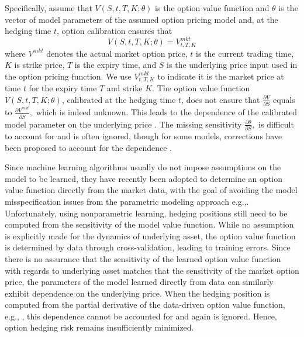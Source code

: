 \documentclass[letterpaper,12pt,titlepage,oneside,final]{book}
\numberwithin{equation}{section}
\theoremstyle{definition}
\newcommand{\Vmkt}{V^{mkt}}
\begin{document}
Specifically, assume that $V(S,t,T,K;\theta)$ is  the option value function and $\theta$ is the vector of model parameters of the assumed option pricing model and, at the hedging time $t$,
option calibration ensures that
\begin{equation} \label{eq:imp}
V(S,t,T,K; \theta)=V^{mkt}_{t,T,K}
\end{equation}
where $\Vmkt$ denotes the actual market option price,  $t$ is the current trading time,  $K$  is  strike price,  $T$ is the expiry time, and $S$ is the underlying price input used in the option pricing function. We use $V^{mkt}_{t,T,K}$ to indicate it is the market price at time $t$ for  the expiry time $T$ and strike $K$.
The option value function $V(S,t,T,K; \theta)$, calibrated at the hedging time $t$,  does not ensure that
 $
\frac{\partial V}{\partial S}
$
equals to
$
\frac{\partial \Vmkt}{\partial S},
$
which is indeed unknown.
This leads to the dependence of the calibrated model parameter on the underlying price \citep{knian2017,coleman2001,hulloptimal}. The missing sensitivity $
\frac{\partial \theta}{\partial S},
$ is difficult to account for and is often ignored, though
for some models, corrections have been proposed to account for the dependence \citep{hulloptimal,hagan2017bartlett,bartlett2006hedging}.


Since machine learning algorithms usually do not impose assumptions on the model to be learned, they have recently been adopted to determine an option value function directly from the market data, with the goal of avoiding the model misspecification issues from the parametric modeling approach e.g.,\citep{gradojevic2009option,garcia2000pricing,hutchinson}.
Unfortunately, using nonparametric learning, hedging positions still need to be computed from the sensitivity of the model value function.
While no assumption is explicitly made for the  dynamics of underlying asset, the option value function is determined by data through cross-validation, leading to training errors.
Since there is no assurance that the  sensitivity of the learned option value function  with regards to underlying asset matches that the sensitivity of the market option price,
the parameters of the model learned directly from data can similarly exhibit dependence on the underlying price. When the hedging position is computed from the partial derivative of the data-driven option value function, e.g.,  \citep{hutchinson}, this dependence cannot be accounted for and again is ignored. Hence, option hedging risk remains insufficiently minimized.
\end{document}
